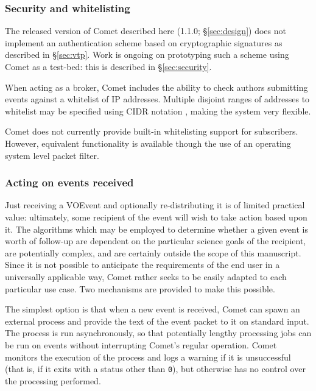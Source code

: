 \documentclass[5p,authoryear]{elsarticle}
\begin{document}
\subsubsection{Security and whitelisting}
\label{sec:design:security}

The released version of Comet described here (1.1.0; \S\ref{sec:design}) does
not implement an authentication scheme based on cryptographic signatures as
described in \S\ref{sec:vtp}. Work is ongoing on prototyping such a scheme
using Comet as a test-bed: this is described in \S\ref{sec:security}.

When acting as a broker, Comet includes the ability to check authors
submitting events against a whitelist of IP addresses. Multiple disjoint
ranges of addresses to whitelist may be specified using CIDR notation
\citep{Fuller:1993}, making the system very flexible.

Comet does not currently provide built-in whitelisting support for
subscribers. However, equivalent functionality is available though the use of
an operating system level packet filter.

\subsubsection{Acting on events received}
\label{sec:design:plugin}

Just receiving a VOEvent and optionally re-distributing it is of limited
practical value: ultimately, some recipient of the event will wish to take
action based upon it. The algorithms which may be employed to determine
whether a given event is worth of follow-up are dependent on the particular
science goals of the recipient, are potentially complex, and are certainly
outside the scope of this manuscript. Since it is not possible to anticipate
the requirements of the end user in a universally applicable way, Comet rather
seeks to be easily adapted to each particular use case. Two mechanisms are
provided to make this possible.

The simplest option is that when a new event is received, Comet can spawn an
external process and provide the text of the event packet to it on standard
input.  The process is run asynchronously, so that potentially lengthy
processing jobs can be run on events without interrupting Comet's regular
operation.  Comet monitors the execution of the process and logs a warning if
it is unsuccessful (that is, if it exits with a status other than \texttt{0}),
but otherwise has no control over the processing performed.
\end{document}
